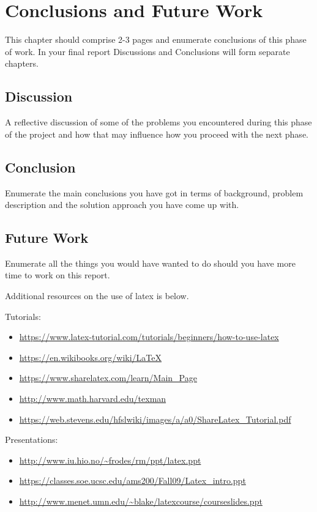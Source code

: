 \chapter{Conclusions and Future Work}
This chapter should comprise 2-3 pages and enumerate conclusions of this phase of work. In your final report Discussions and Conclusions will form separate chapters.

\section{Discussion}
A reflective discussion of some of the problems you encountered during this phase of the project and how that may influence how you proceed with the next phase.

\section{Conclusion}
Enumerate the main conclusions you have got in terms of background, problem description and the solution approach you have come up with.

\section{Future Work}
Enumerate all the things you would have wanted to do should you have more time to work on this report.

Additional resources on the use of latex is below.

Tutorials:
\begin{itemize}
    \item \url{https://www.latex-tutorial.com/tutorials/beginners/how-to-use-latex}
    \item \url{https://en.wikibooks.org/wiki/LaTeX}
    \item \url{https://www.sharelatex.com/learn/Main_Page}
    \item \url{http://www.math.harvard.edu/texman}
    \item \url{https://web.stevens.edu/hfslwiki/images/a/a0/ShareLatex_Tutorial.pdf}
\end{itemize}

Presentations:
\begin{itemize}
    \item \url{http://www.iu.hio.no/~frodes/rm/ppt/latex.ppt}
    \item \url{https://classes.soe.ucsc.edu/ams200/Fall09/Latex_intro.ppt}
    \item \url{http://www.menet.umn.edu/~blake/latexcourse/courseslides.ppt}
\end{itemize}
